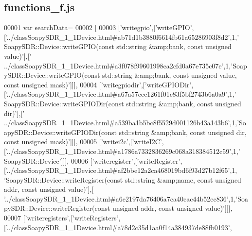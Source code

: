 \subsection{functions\+\_\+f.\+js}
\label{functions__f_8js_source}

\begin{DoxyCode}
00001 var searchData=
00002 [
00003   [\textcolor{stringliteral}{'writegpio'},[\textcolor{stringliteral}{'writeGPIO'},[\textcolor{stringliteral}{'../classSoapySDR\_1\_1Device.html#ab71d1b3880f6614fb61a65286903f8d2'},1,\textcolor{stringliteral}{'
      SoapySDR::Device::writeGPIO(const std::string &amp;bank, const unsigned value)'}],[\textcolor{stringliteral}{'
      ../classSoapySDR\_1\_1Device.html#a3f078f99601998ca2cfd0a67e735c07e'},1,\textcolor{stringliteral}{'SoapySDR::Device::writeGPIO(const std::string &amp;bank, const
       unsigned value, const unsigned mask)'}]]],
00004   [\textcolor{stringliteral}{'writegpiodir'},[\textcolor{stringliteral}{'writeGPIODir'},[\textcolor{stringliteral}{'../classSoapySDR\_1\_1Device.html#a67a57cee1261f01c83f5bf2743b6a0a9'},1,\textcolor{stringliteral}{'
      SoapySDR::Device::writeGPIODir(const std::string &amp;bank, const unsigned dir)'}],[\textcolor{stringliteral}{'
      ../classSoapySDR\_1\_1Device.html#a539ba1b5bc8f5529d001126b43a143b6'},1,\textcolor{stringliteral}{'SoapySDR::Device::writeGPIODir(const std::string &amp;bank,
       const unsigned dir, const unsigned mask)'}]]],
00005   [\textcolor{stringliteral}{'writei2c'},[\textcolor{stringliteral}{'writeI2C'},[\textcolor{stringliteral}{'../classSoapySDR\_1\_1Device.html#a1786a7332836269c068a318384512c59'},1,\textcolor{stringliteral}{'
      SoapySDR::Device'}]]],
00006   [\textcolor{stringliteral}{'writeregister'},[\textcolor{stringliteral}{'writeRegister'},[\textcolor{stringliteral}{'../classSoapySDR\_1\_1Device.html#af2bbe12a2ca468019bd6f93d27b12f65'},1,\textcolor{stringliteral}{
      'SoapySDR::Device::writeRegister(const std::string &amp;name, const unsigned addr, const unsigned value)'}],[\textcolor{stringliteral}{
      '../classSoapySDR\_1\_1Device.html#a6e2197da76406a7ca40cac44b52ec836'},1,\textcolor{stringliteral}{'SoapySDR::Device::writeRegister(const
       unsigned addr, const unsigned value)'}]]],
00007   [\textcolor{stringliteral}{'writeregisters'},[\textcolor{stringliteral}{'writeRegisters'},[\textcolor{stringliteral}{'../classSoapySDR\_1\_1Device.html#a78d2c35d1aa0f14a384937de88fb0193'},

\end{DoxyCode}
